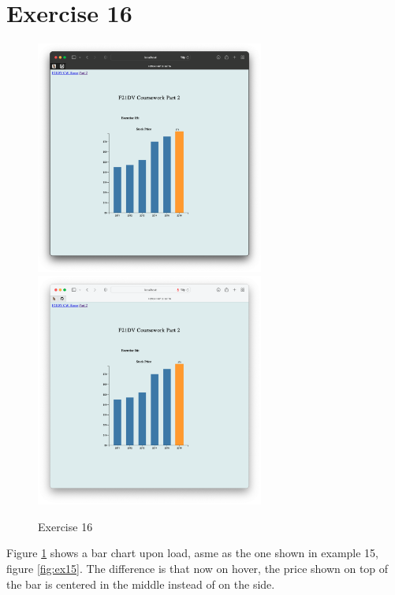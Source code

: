\documentclass{scrreprt}
\begin{document}
\section{Exercise 16}
\begin{figure}[!ht]
    \centering
    \includegraphics[width = 7.5cm]{images/ex15_2.png}
    \includegraphics[width = 7.5cm]{images/ex16.png}
    \label{fig:ex16}
    \caption{Exercise 16}
\end{figure}
\FloatBarrier
% 
Figure \ref{fig:ex16} shows a bar chart upon load, asme as the one shown in example 15, figure \ref{fig:ex15}. The difference is that now on hover, the price shown on top of the bar is centered in the middle instead of on the side. 

\newpage
\end{document}
